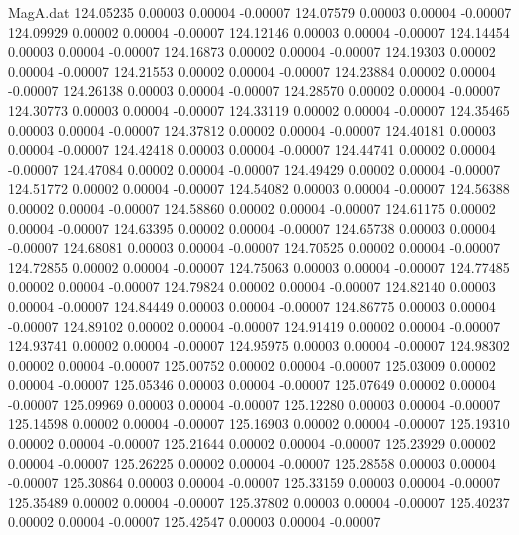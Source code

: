 \begin{filecontents}{MagA.dat}
 124.05235    0.00003    0.00004   -0.00007
 124.07579    0.00003    0.00004   -0.00007
 124.09929    0.00002    0.00004   -0.00007
 124.12146    0.00003    0.00004   -0.00007
 124.14454    0.00003    0.00004   -0.00007
 124.16873    0.00002    0.00004   -0.00007
 124.19303    0.00002    0.00004   -0.00007
 124.21553    0.00002    0.00004   -0.00007
 124.23884    0.00002    0.00004   -0.00007
 124.26138    0.00003    0.00004   -0.00007
 124.28570    0.00002    0.00004   -0.00007
 124.30773    0.00003    0.00004   -0.00007
 124.33119    0.00002    0.00004   -0.00007
 124.35465    0.00003    0.00004   -0.00007
 124.37812    0.00002    0.00004   -0.00007
 124.40181    0.00003    0.00004   -0.00007
 124.42418    0.00003    0.00004   -0.00007
 124.44741    0.00002    0.00004   -0.00007
 124.47084    0.00002    0.00004   -0.00007
 124.49429    0.00002    0.00004   -0.00007
 124.51772    0.00002    0.00004   -0.00007
 124.54082    0.00003    0.00004   -0.00007
 124.56388    0.00002    0.00004   -0.00007
 124.58860    0.00002    0.00004   -0.00007
 124.61175    0.00002    0.00004   -0.00007
 124.63395    0.00002    0.00004   -0.00007
 124.65738    0.00003    0.00004   -0.00007
 124.68081    0.00003    0.00004   -0.00007
 124.70525    0.00002    0.00004   -0.00007
 124.72855    0.00002    0.00004   -0.00007
 124.75063    0.00003    0.00004   -0.00007
 124.77485    0.00002    0.00004   -0.00007
 124.79824    0.00002    0.00004   -0.00007
 124.82140    0.00003    0.00004   -0.00007
 124.84449    0.00003    0.00004   -0.00007
 124.86775    0.00003    0.00004   -0.00007
 124.89102    0.00002    0.00004   -0.00007
 124.91419    0.00002    0.00004   -0.00007
 124.93741    0.00002    0.00004   -0.00007
 124.95975    0.00003    0.00004   -0.00007
 124.98302    0.00002    0.00004   -0.00007
 125.00752    0.00002    0.00004   -0.00007
 125.03009    0.00002    0.00004   -0.00007
 125.05346    0.00003    0.00004   -0.00007
 125.07649    0.00002    0.00004   -0.00007
 125.09969    0.00003    0.00004   -0.00007
 125.12280    0.00003    0.00004   -0.00007
 125.14598    0.00002    0.00004   -0.00007
 125.16903    0.00002    0.00004   -0.00007
 125.19310    0.00002    0.00004   -0.00007
 125.21644    0.00002    0.00004   -0.00007
 125.23929    0.00002    0.00004   -0.00007
 125.26225    0.00002    0.00004   -0.00007
 125.28558    0.00003    0.00004   -0.00007
 125.30864    0.00003    0.00004   -0.00007
 125.33159    0.00003    0.00004   -0.00007
 125.35489    0.00002    0.00004   -0.00007
 125.37802    0.00003    0.00004   -0.00007
 125.40237    0.00002    0.00004   -0.00007
 125.42547    0.00003    0.00004   -0.00007

\end{filecontents}
